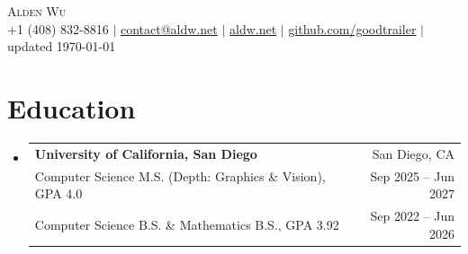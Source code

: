 \documentclass[letterpaper,11pt]{article}
\makeatletter
\newcommand{\resumeSubheadingMS}[6]{
  \vspace{-2pt}\item
    \begin{tabular*}{0.97\textwidth}[t]{l@{\extracolsep{\fill}}r}
      \textbf{#1} & #2 \\
      {\small#3} & {\small #4} \\
      {\small#5} & {\small #6} \\
    \end{tabular*}\vspace{-7pt}
}
\newcommand{\resumeSubHeadingListStart}{\begin{itemize}[leftmargin=0.15in, label={}]}
\newcommand{\resumeSubHeadingListEnd}{\end{itemize}}
\makeatother
\begin{document}

\begin{center}
    {\huge \scshape Alden Wu} \\[0.2em]
    \small
    +1 (408) 832-8816 $\mid$
    \href{mailto:contact@aldw.net}{contact@aldw.net} $\mid$
    \href{https://aldw.net/projects}{aldw.net} $\mid$
    \href{https://github.com/goodtrailer}{github.com/goodtrailer} $\mid$
    updated \today
\end{center}

\section{Education}
    \resumeSubHeadingListStart
        \resumeSubheadingMS
            {University of California, San Diego}{San Diego, CA}
            {Computer Science M.S. (Depth: Graphics \& Vision), GPA 4.0}{Sep 2025 -- Jun 2027}
            {Computer Science B.S. \& Mathematics B.S., GPA 3.92}{Sep 2022 -- Jun 2026}
    \resumeSubHeadingListEnd

\end{document}

